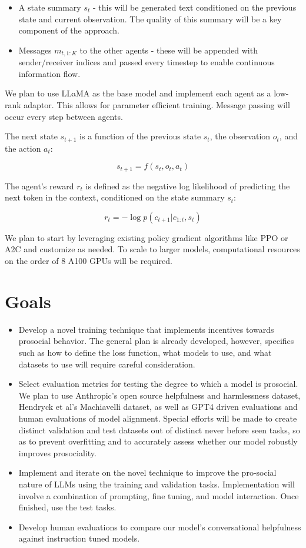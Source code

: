 \documentclass{article}
\begin{document}
\begin{itemize}
\item A state summary $s_t$ - this will be generated text conditioned on the previous state and current observation. The quality of this summary will be a key component of the approach.
\item Messages $m_{t,1:K}$ to the other agents - these will be appended with sender/receiver indices and passed every timestep to enable continuous information flow.
\end{itemize}

We plan to use LLaMA as the base model and implement each agent as a low-rank adaptor. This allows for parameter efficient training. Message passing will occur every step between agents.

The next state $s_{t+1}$ is a function of the previous state $s_t$, the observation $o_t$, and the action $a_t$:

\[s_{t+1} = f(s_t, o_t, a_t)\]

The agent's reward $r_t$ is defined as the negative log likelihood of predicting the next token in the context, conditioned on the state summary $s_t$:

\[r_t = -\log p(c_{t+1} | c_{1:t}, s_t)\]

We plan to start by leveraging existing policy gradient algorithms like PPO or A2C and customize as needed. To scale to larger models, computational resources on the order of 8 A100 GPUs will be required.

\section{Goals}

\begin{itemize}
\item Develop a novel training technique that implements incentives towards prosocial behavior. The general plan is already developed, however, specifics such as how to define the loss function, what models to use, and what datasets to use will require careful consideration.
\item Select evaluation metrics for testing the degree to which a model is prosocial. We plan to use Anthropic’s open source helpfulness and harmlessness dataset, Hendryck et al's Machiavelli dataset, as well as GPT4 driven evaluations and human evaluations of model alignment. Special efforts will be made to create distinct validation and test datasets out of distinct never before seen tasks, so as to prevent overfitting and to accurately assess whether our model robustly improves prosociality.
\item Implement and iterate on the novel technique to improve the pro-social nature of LLMs using the training and validation tasks. Implementation will involve a combination of prompting, fine tuning, and model interaction. Once finished, use the test tasks.
\item Develop human evaluations to compare our model's conversational helpfulness against instruction tuned models.
\end{itemize}
\end{document}
